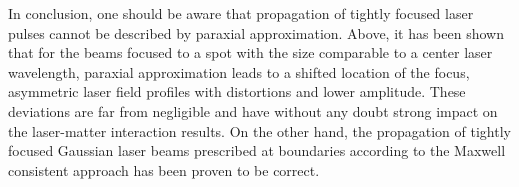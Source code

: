 In conclusion, one should be aware that propagation of tightly focused laser pulses cannot be described by paraxial approximation. Above, it has been shown that for the beams focused to a spot with the size comparable to a center laser wavelength, paraxial approximation leads to a shifted location of the focus, asymmetric laser field profiles with distortions and lower amplitude. These deviations are far from negligible and have without any doubt strong impact on the laser-matter interaction results. On the other hand, the propagation of tightly focused Gaussian laser beams prescribed at boundaries according to the Maxwell consistent approach has been proven to be correct.
